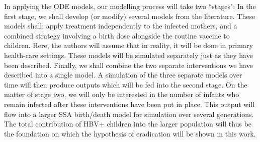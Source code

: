 \documentclass[11pt,a4paper]{article}
\begin{document}
In applying the ODE models, our modelling process will take two ``stages":
In the first stage, we shall develop (or modify) several models from the literature. These models shall: apply treatment independently to the infected mothers, and a combined strategy involving a birth dose alongside the routine vaccine to children. Here, the authors will assume that in reality, it will be done in primary health-care settings. These models will be simulated separately just as they have been described. Finally, we shall combine the two separate interventions we have described into a single model. A simulation of the three separate models over time will then produce outputs which will be fed into the second stage. On the matter of stage two, we will only be interested in the number of infants who remain infected after these interventions have been put in place. This output will flow into a larger SSA birth/death model for simulation over several generations.  
The total contribution of HBV+ children into the larger population will thus be the foundation
on which the hypothesis of eradication will be shown in this work.
 
 


\end{document}
